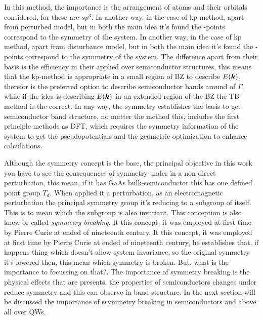 In this method, the importance is the arrangement of atoms and their orbitals considered, for  these are $sp^{3}$. 
In another way, in the case of \gls{kp} method, apart from perturbed model, but in both the main idea it's found the \ks-points correspond to the symmetry of the system. In another way, in the case of \gls{kp} method, apart from disturbance model, but in both the main idea it's found the \ks-points correspond to the symmetry of the system. The difference apart from their basis is the efficiency in their applied over semiconductor structures, this means that the \gls{kp}-method is appropriate in a small region of \gls{BZ} to describe $E{(\boldsymbol{k} )}$, therefor is the preferred option to describe semiconductor bands around of $\Gamma$, while if the idea is describing $E{(\boldsymbol{k})}$ in an extended region of the \gls{BZ} the \gls{TB}-method is the correct\cite{dresselhaus2007group,bir1974symmetry}. In any way, the symmetry establishes the basis to get semiconductor band structure, no matter the method this, includes the first principle methods as DFT, which requires the symmetry information of the system to get the pseudopotentials and the geometric optimization to enhance calculations.

Although the symmetry concept is the base, the principal objective in this work you have to see the consequences of symmetry under in a non-direct perturbation, this mean, if it has GaAs bulk-semiconductor this has one defined point group $T_{d}$. When applied it a perturbation, as an electromagnetic perturbation the principal symmetry group it's reducing to a subgroup of itself. This is to mean which the subgroup is also invariant. This conception is also knew or called \emph{symmetry breaking}. It this concept, it was employed at first time by Pierre Curie at ended of nineteenth century\cite{curie1894symetrie,sep-symmetry-breaking}, It this concept, it was employed at first time by Pierre Curie at ended of nineteenth century, he establishes that, if happens thing which doesn't allow system invariance, so the original symmetry it's lowered then,  this mean which symmetry is broken. 
But, what is  the importance to focussing on that?. The importance of symmetry breaking is the physical effects that are presents, the properties of semiconductors changes under reduce symmetry and this can observe in band structure.  In the next section will be discussed the importance of ssymmetry breaking in semiconductors and above all over QWs. 



